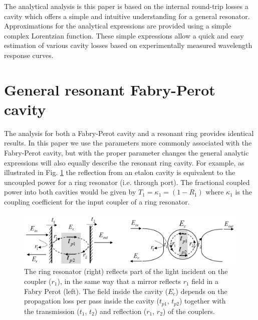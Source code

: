 \documentclass[10pt]{article}
\begin{document}
The analytical analysis is this paper is based on the internal round-trip losses a cavity which offers a simple and intuitive understanding for a general resonator. Approximations for the analytical expressions are provided using a simple complex Lorentzian function.  These simple expressions allow a quick and easy estimation of various cavity losses based on experimentally measured wavelength response curves.  



\section{General resonant Fabry-Perot cavity}
The analysis for both a Fabry-Perot cavity and a resonant ring provides identical results.  In this paper we use the parameters more commonly associated with the Fabry-Perot cavity, but with the proper parameter changes the general analytic expressions will also equally describe the resonant ring cavity. For example, as illustrated in Fig. \ref{fig:resonator}  the reflection from an etalon cavity is equivalent to the uncoupled power for a ring resonator (i.e. through port).   The fractional coupled power into both cavities would be given by $T_1 = \kappa_1=(1-R_1)$  where $\kappa_1$ is the coupling coefficient for the input coupler of a ring resonator.


\begin{figure}[htbp]
\centering\includegraphics[width=1.0\textwidth]{figures/resonator_v4}
\caption{
The ring resonator (right) reflects part of the light incident on the coupler ($r_1$), in the same way that a  mirror reflects $r_1$ field in a Fabry Perot (left). The field inside the cavity ($E_c$) depends on the propagation loss per pass inside the cavity  ($t_{p1}$, $t_{p2}$)  together with
the transmission ($t_1$, $t_2$) and reflection ($r_1$, $r_2$) of the couplers. 
}
\label{fig:resonator}
\end{figure}
\end{document}

